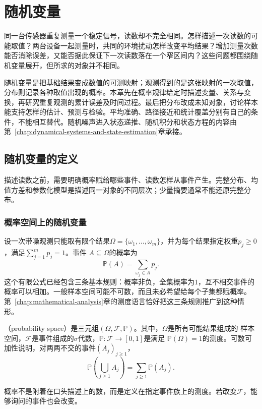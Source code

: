 \chapter{随机变量}
\label{chap:random-variables}
\label{chap:probability-theory}
\label{chap:stochastic-processes-and-approximation}
\label{chap:mathematical-statistics}

同一台传感器重复测量一个稳定信号，读数却不完全相同。怎样描述一次读数的可能取值？两台设备一起测量时，共同的环境扰动怎样改变平均结果？增加测量次数能否消除误差，又能否据此保证下一次读数落在一个窄区间内？这些问题都围绕随机变量展开，但所求的对象并不相同。

随机变量是把基础结果变成数值的可测映射；观测得到的是这张映射的一次取值，分布则记录各种取值出现的概率。本章先在概率规律给定时描述变量、关系与变换，再研究重复观测的累计误差及时间过程。最后把分布改成未知对象，讨论样本能支持怎样的估计、预测与检验。平均准确、路径接近和统计覆盖分别有自己的条件，不能相互替代。随机噪声进入状态递推、随机积分和状态方程的内容由第~\ref{chap:dynamical-systems-and-state-estimation}章承接。

\section{随机变量的定义}
\label{sec:rv-definition}
\label{sec:probability-representation-conditioning}
描述读数之前，需要明确概率赋给哪些事件、读数怎样从事件产生。完整分布、均值方差和参数化模型是描述同一对象的不同层次；少量摘要通常不能还原完整分布。

\subsection{概率空间上的随机变量}
\label{sec:probability-spaces-random-variables}
设一次带噪观测只能取有限个结果\(\Omega=\{\omega_1,\ldots,\omega_m\}\)，并为每个结果指定权重\(p_j\geq0\)，满足\(\sum_{j=1}^{m}p_j=1\)。事件
\(A\subseteq\Omega\)的概率为
\[ \mathbb{P}(A)=\sum_{\omega_j\in A}p_j. \]
这个有限公式已经包含三条基本规则：概率非负，全集概率为\(1\)，互不相交事件的概率可以相加。一般样本空间可能不可数，而且未必希望给每个子集都赋概率。第~\ref{chap:mathematical-analysis}章的测度语言恰好把这三条规则推广到这种情形。

\begin{definition}[概率空间]
  \label{def:probability-space}
（probability space）是三元组\((\Omega,\mathcal{F},\mathbb{P})\)。其中，\(\Omega\)是所有可能结果组成的
样本空间，\(\mathcal{F}\)是事件组成的\(\sigma\)代数，\(\mathbb{P}:\mathcal{F}\to[0,1]\)是满足
\(\mathbb{P}(\Omega)=1\)的测度。可数可加性说明，对两两不交的事件\((A_j)_{j\geq1}\)，
\[ \mathbb{P}\left(\bigcup_{j\geq1}A_j\right)
  =\sum_{j\geq1}\mathbb{P}(A_j). \]
\end{definition}
概率不是附着在口头描述上的数，而是定义在指定事件族上的测度。若改变\(\mathcal{F}\)，能够询问的事件也会改变。


